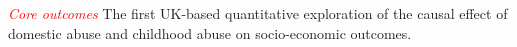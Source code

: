 \documentclass[11pt, a4paper]{article}
\begin{document}








%
%
% 
%
%
%
%
%

\textcolor{red}{\textit{Core outcomes}}
 The first UK-based quantitative exploration of the causal effect of domestic abuse and childhood abuse on socio-economic outcomes.
\end{document}

